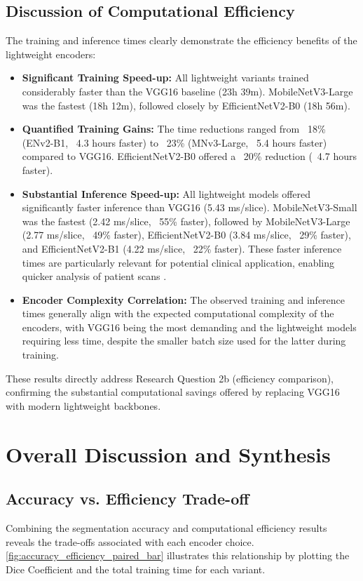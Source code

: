 \subsection{Discussion of Computational Efficiency}
The training and inference times clearly demonstrate the efficiency benefits of the lightweight encoders:
\begin{itemize}
  \item \textbf{Significant Training Speed-up:} All lightweight variants trained considerably faster than the VGG16 baseline (23h 39m). MobileNetV3-Large was the fastest (18h 12m), followed closely by EfficientNetV2-B0 (18h 56m).
  \item \textbf{Quantified Training Gains:} The time reductions ranged from ~18\% (ENv2-B1, ~4.3 hours faster) to ~23\% (MNv3-Large, ~5.4 hours faster) compared to VGG16. EfficientNetV2-B0 offered a ~20\% reduction (~4.7 hours faster).
  \item \textbf{Substantial Inference Speed-up:} All lightweight models offered significantly faster inference than VGG16 (5.43 ms/slice). MobileNetV3-Small was the fastest (2.42 ms/slice, ~55\% faster), followed by MobileNetV3-Large (2.77 ms/slice, ~49\% faster), EfficientNetV2-B0 (3.84 ms/slice, ~29\% faster), and EfficientNetV2-B1 (4.22 ms/slice, ~22\% faster). These faster inference times are particularly relevant for potential clinical application, enabling quicker analysis of patient scans \parencite{diagnostics13162670}.
  \item \textbf{Encoder Complexity Correlation:} The observed training and inference times generally align with the expected computational complexity of the encoders, with VGG16 being the most demanding and the lightweight models requiring less time, despite the smaller batch size used for the latter during training.
\end{itemize}
These results directly address Research Question 2b (efficiency comparison), confirming the substantial computational savings offered by replacing VGG16 with modern lightweight backbones.

\section{Overall Discussion and Synthesis}

\subsection{Accuracy vs. Efficiency Trade-off}
Combining the segmentation accuracy and computational efficiency results reveals the trade-offs associated with each encoder choice. \ref{fig:accuracy_efficiency_paired_bar} illustrates this relationship by plotting the Dice Coefficient and the total training time for each variant.


